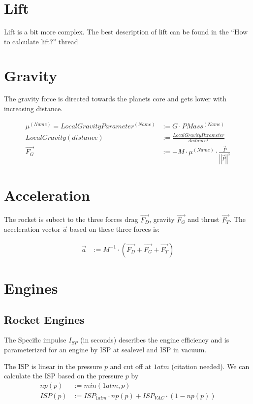 \documentclass[11pt]{article}
\newcommand{\oa}[1]{\overrightarrow{#1}}
\newcommand{\F}[1]{\oa{F_{#1}}}
\newcommand{\Pos}{\oa{P}}
\newcommand{\absvec}[1]{\left|\left|{#1}\right|\right|}
\begin{document}
\section{Lift}

Lift is a bit more complex. The best description of lift can be found in the ``How to calculate lift?'' thread \cite{Lift}

\section{Gravity}

The gravity force is directed towards the planets core and gets lower
with increasing distance.

\begin{align}
  \mu^{(Name)} = LocalGravityParameter^{(Name)} &:= G \cdot PMass^{(Name)} \nonumber\\
  LocalGravity(distance) &:= \frac{LocalGravityParameter}{distance^2}\nonumber\\
  \F{G} &:= - M \cdot \mu^{(Name)}\cdot\frac{\Pos}{\absvec{\Pos}^3}
\end{align}

\section{Acceleration}

The rocket is subect to the three forces drag $\F{D}$, gravity $\F{G}$
and thrust $\F{T}$.  The acceleration vector $\oa{a}$ based on these
three forces is:

\begin{align}
  \oa{a} &:= M^{-1} \cdot(\F{D} + \F{G} + \F{T})
\end{align}

\section{Engines}

\subsection{Rocket Engines}

The Specific impulse $I_{SP}$ (in seconds) describes the engine
efficiency and is parameterized for an engine by ISP at sealevel and
ISP in vacuum.

The ISP is linear in the pressure $p$ and cut off at $1atm$
(citation needed).  We can calculate the ISP based on the pressure
$p$ by
\begin{align}
  np(p) &:= min(1 atm, p)\\
  ISP(p) &:= ISP_{1atm} \cdot np(p) + ISP_{VAC} \cdot (1-np(p))
\end{align}
\end{document}
